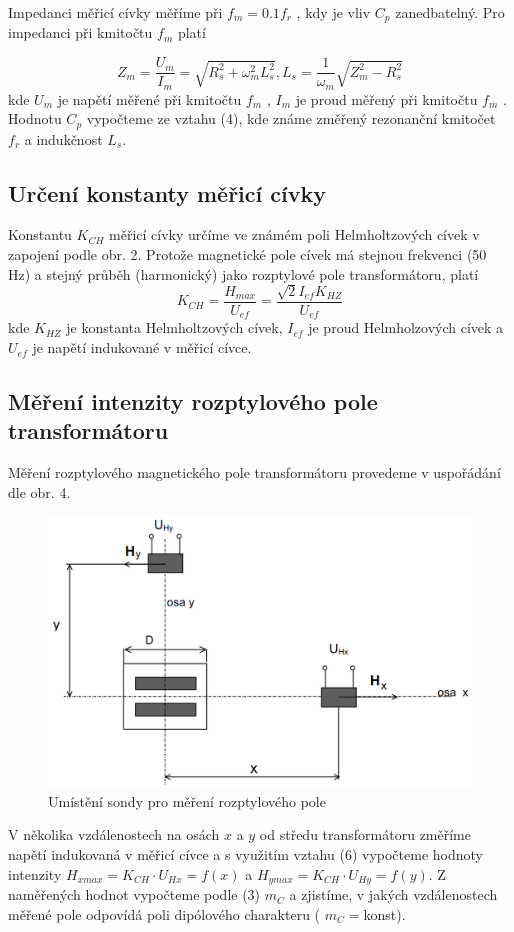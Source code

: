 \documentclass{article}
\begin{document}
Impedanci měřicí cívky měříme při  $f_m = 0.1 f_r$ , kdy je vliv  $C_p$  zanedbatelný. Pro impedanci při kmitočtu  $f_m$  platí

\begin{equation}
	Z_m = \frac{U_m}{I_m} = \sqrt{R_s^2+\omega_m^2L_s^2}, L_s = \frac{1}{\omega_m}\sqrt{Z_m^2-R_s^2}
\end{equation}
kde $U_m$ je napětí měřené při kmitočtu  $f_m$ , $I_m$  je proud měřený při kmitočtu  $f_m$ . Hodnotu $C_p$ vypočteme ze vztahu (4), kde známe změřený rezonanční kmitočet $f_r$ a indukčnost $L_s$. 

\subsection{Určení konstanty měřicí cívky}
Konstantu  $K_{CH}$  měřicí cívky určíme ve známém poli Helmholtzových cívek v zapojení podle obr. 2. Protože magnetické pole cívek má stejnou frekvenci (50 \si{\hertz}) a stejný průběh (harmonický) jako rozptylové pole transformátoru, platí
\begin{equation}
	K_{CH} = \frac{H_{max}}{U_{ef}} = \frac{\sqrt{2}I_{ef}K_{HZ}}{U_{ef}}
\end{equation}
kde  $K_{HZ}$  je konstanta Helmholtzových cívek, 
$I_{ef}$  je proud Helmholzových cívek a $U_{ef}$ je napětí indukované v měřicí cívce.

\subsection{Měření intenzity rozptylového pole transformátoru }
Měření rozptylového magnetického pole transformátoru provedeme v uspořádání dle obr. 4.
\begin{figure}[H]
	\centering
	\includegraphics[width=0.6\linewidth]{screenshot003}
	\caption{Umístění sondy pro měření rozptylového pole}
	\label{fig:screenshot003}
\end{figure}
V několika vzdálenostech na osách $x$ a $y$ od středu transformátoru změříme napětí indukovaná v měřicí cívce a s využitím vztahu (6) vypočteme hodnoty  intenzity  $H_{xmax} =  K_{CH}\cdot U_{Hx} = f(x)$  a  $H_{ymax} = K_{CH}\cdot U_{Hy} = f(y)$.  Z naměřených hodnot vypočteme podle (3) $m_C$ a zjistíme, v jakých vzdálenostech měřené pole odpovídá poli dipólového charakteru ( $m_C = $konst). 
\end{document}
